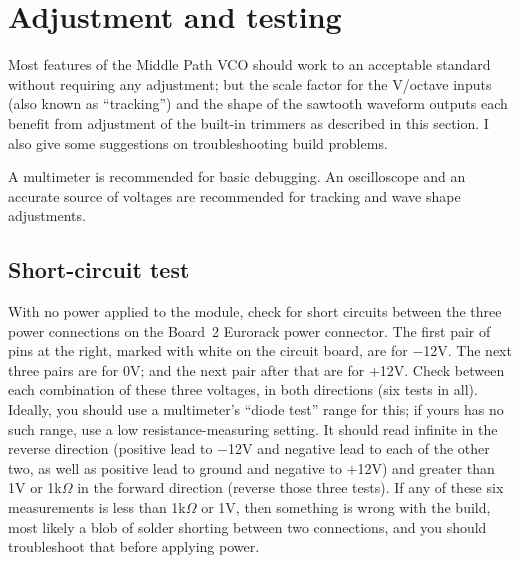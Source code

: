 
%
%
%
%
%
%
\chapter{Adjustment and testing}

Most features of the Middle Path VCO should work to an acceptable standard
without requiring any adjustment; but the scale factor for the V/octave
inputs (also known as ``tracking'') and the shape of the sawtooth waveform
outputs each benefit from adjustment of the built-in trimmers as described
in this section.  I also give some suggestions on troubleshooting build
problems.

A multimeter is recommended for basic debugging.  An oscilloscope and an
accurate source of voltages are recommended for tracking and wave shape
adjustments.

\section{Short-circuit test}

With no power applied to the module, check for short circuits between the
three power connections on the Board~2 Eurorack power connector.  The first
pair of pins at the right, marked with white on the circuit board, are for
$-$12V.  The next three pairs are for 0V; and the next pair after that are for
$+$12V.  Check between each combination of these three voltages, in both
directions (six tests in all).  Ideally, you should use a multimeter's
``diode test'' range for this; if yours has no such range, use a low
resistance-measuring setting.  It should read infinite in the reverse
direction (positive lead to $-$12V and negative lead to each of the other
two, as well as positive lead to ground and negative to $+$12V) and greater
than 1V or 1k$\Omega$ in the forward direction (reverse those three tests). 
If any of these six measurements is less than 1k$\Omega$ or 1V, then
something is wrong with the build, most likely a blob of solder shorting
between two connections, and you should troubleshoot that before applying
power.

